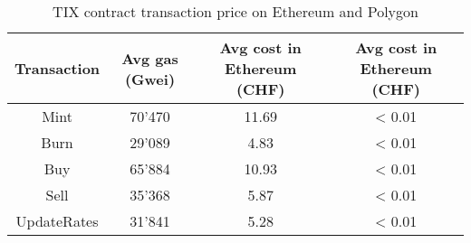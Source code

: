 \documentclass[a4paper,11pt,oneside]{report}
\begin{document}
\begin{table}[h!]
\begin{center}
\begin{NiceTabular}{ |c||c|c|c| }
 \hline
 Transaction & Avg gas (Gwei) & Avg cost in Ethereum (CHF) & Avg cost in Ethereum (CHF) \\
 \hline \hline
 Mint & 70'470 & 11.69 & < 0.01 \\
 Burn & 29'089 & 4.83 & < 0.01 \\
 Buy & 65'884 & 10.93 & < 0.01 \\
 Sell & 35'368 & 5.87 & < 0.01 \\
 UpdateRates & 31'841 & 5.28 & < 0.01 \\
 \hline
\end{NiceTabular}
\caption{TIX contract transaction price on Ethereum and Polygon}
\label{table:tix_contract_transaction_cost}
\end{center}
\end{table}

\begin{table}[h!]
\begin{center}
\captionsetup{justification=centering}
\caption{Ticketing contract transaction cost}
\label{table:ticketing_contract_transcation_cost}
\end{center}
\end{table}
\end{document}
